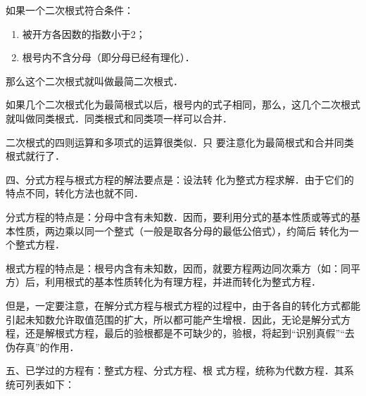 如果一个二次根式符合条件：
\begin{enumerate}
    \item 被开方各因数的指数小于2；
    \item 根号内不含分母（即分母已经有理化）．
\end{enumerate}
那么这个二次根式就叫做最简二次根式．

如果几个二次根式化为最简根式以后，根号内的式子相同，那么，这几个二次根式就叫做同类根式．同类根式和同类项一样可以合并．

二次根式的四则运算和多项式的运算很类似．只
要注意化为最简根式和合并同类根式就行了．

四、分式方程与根式方程的解法要点是：设法转
化为整式方程求解．由于它们的特点不同，转化方法也就不同．

分式方程的特点是：分母中含有未知数．因而，要利用分式的基本性质或等式的基本性质，两边乘以同一个整式（一般是取各分母的最低公倍式），约简后
转化为一个整式方程．

根式方程的特点是：根号内含有未知数，因而，就要方程两边同次乘方（如：同平方）后，利用根式的基本性质转化为有理方程，并进而转化为整式方程．

但是，一定要注意，在解分式方程与根式方程的过程中，由于各自的转化方式都能引起未知数允许取值范围的扩大，所以都可能产生增根．因此，无论是解分式方程，还是解根式方程，最后的验根都是不可缺少的，验根，将起到“识别真假”“去伪存真”的作用．

五、已学过的方程有：整式方程、分式方程、根
式方程，统称为代数方程．其系统可列表如下：
\begin{center}
\end{center}
